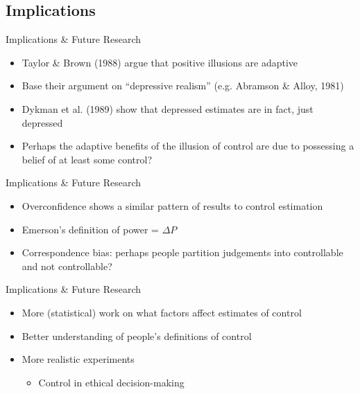 \documentclass{beamer}
\newcommand{\deltap}{$\Delta P$}
\begin{document}
\subsection*{Implications}
\begin{frame}{Implications \& Future Research}
	\begin{itemize}	
		\item Taylor \& Brown (1988) argue that positive illusions are adaptive
		\item Base their argument on ``depressive realism'' (e.g. Abramson \& Alloy, 1981)
		\item Dykman et al. (1989) show that depressed estimates are in fact, just depressed
		\item Perhaps the adaptive benefits of the illusion of control are due to possessing a belief of at least some control?
	\end{itemize}
\end{frame}

\begin{frame}{Implications \& Future Research}
	\begin{itemize}	
		\item Overconfidence shows a similar pattern of results to control estimation
		\item Emerson's definition of power = \deltap
		\item Correspondence bias: perhaps people partition judgements into controllable and not controllable?
	\end{itemize}
\end{frame}

\begin{frame}{Implications \& Future Research}
	\begin{itemize}	
		\item More (statistical) work on what factors affect estimates of control
		\item Better understanding of people's definitions of control
		\item More realistic experiments
		\begin{itemize}
			\item Control in ethical decision-making
		\end{itemize}
	\end{itemize}
\end{frame}
\end{document}
